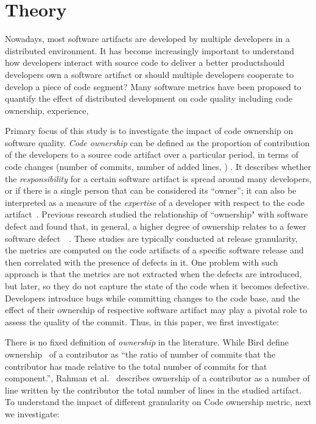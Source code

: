 
\section{Theory}
\label{sec:prob}

Nowadays, most software artifacts are developed by multiple developers in a distributed environment. It has become increasingly important to understand how developers interact with source code to deliver a better product\textemdash should developers own a software artifact or should multiple developers cooperate to develop a piece of code segment? Many software metrics have been proposed to quantify the effect of distributed development on code quality including code ownership, experience, \etc 

Primary focus of this study is to investigate the impact of code ownership on software quality. {\em Code ownership} can be defined as the proportion of contribution of the developers to a source code artifact over a particular period, in terms of code changes (\eg number of commits, number of added lines, \etc) \cite{Greiler:replication}. It describes whether the \textit{responsibility} for a certain software artifact is spread around many developers, or if there is a single person that can be considered its ``owner'';  it can also be interpreted as a measure of the \textit{expertise} of a developer with respect to the code artifact~\cite{bird:original}.  Previous research studied the relationship of ``ownership" with software defect and found that, in general, a higher degree of ownership relates to a fewer software defect~\cite{bird:original}~. These studies are typically conducted at release granularity, 
\ie the metrics are computed on the code artifacts of a specific software release and then correlated with the presence of defects in it. 
One problem with such approach is that the metrics are not extracted when the defects are introduced, but later, so they do not capture the state of the code when it becomes defective. Developers introduce bugs while committing changes to the code base, and the effect of their ownership of respective software artifact may play a pivotal role to assess the quality of the commit.  Thus, in this paper, we first investigate:


There is no fixed definition of {\em ownership} in the literature. While Bird \etal define ownership~\cite{bird:original} of a contributor as ``the ratio of number of commits that the contributor has made relative to the total
number of commits for that component.'', Rahman et al.~\cite{Rahman:blame} describes ownership of a contributor as a number of line written by the contributor \wrt the total number of lines in the studied artifact. To understand the impact of different granularity on Code ownership metric, next we investigate: 

